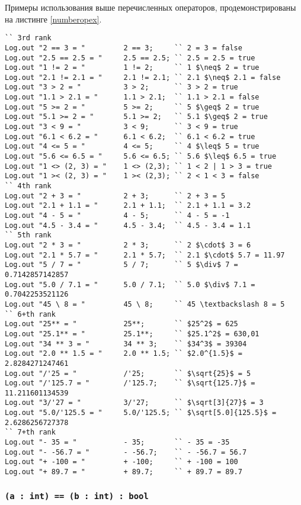 Примеры использования выше перечисленных операторов, продемонстрированы на листинге \ref{numberopex}.

\begin{lstlisting}[caption=Примеры использования операторов над данными типа int и double, label=numberopex]
`` 3rd rank
Log.out "2 == 3 = "			2 == 3;		`` 2 = 3 = false
Log.out "2.5 == 2.5 = "		2.5 == 2.5;	`` 2.5 = 2.5 = true
Log.out "1 != 2 = "			1 != 2;		`` 1 $\neq$ 2 = true
Log.out "2.1 != 2.1 = "		2.1 != 2.1;	`` 2.1 $\neq$ 2.1 = false
Log.out "3 > 2 = "			3 > 2;		`` 3 > 2 = true
Log.out "1.1 > 2.1 = "		1.1 > 2.1;	`` 1.1 > 2.1 = false
Log.out "5 >= 2 = "			5 >= 2;		`` 5 $\geq$ 2 = true
Log.out "5.1 >= 2 = "		5.1 >= 2;	`` 5.1 $\geq$ 2 = true
Log.out "3 < 9 = "			3 < 9;		`` 3 < 9 = true
Log.out "6.1 < 6.2 = "		6.1 < 6.2;	`` 6.1 < 6.2 = true
Log.out "4 <= 5 = "			4 <= 5;		`` 4 $\leq$ 5 = true
Log.out "5.6 <= 6.5 = "		5.6 <= 6.5;	`` 5.6 $\leq$ 6.5 = true
Log.out "1 <> (2, 3) = "	1 <> (2,3); `` 1 < 2 | 1 > 3 = true
Log.out "1 >< (2, 3) = "	1 >< (2,3); `` 2 < 1 < 3 = false
`` 4th rank
Log.out "2 + 3 = "			2 + 3;		`` 2 + 3 = 5
Log.out "2.1 + 1.1 = "		2.1 + 1.1;	`` 2.1 + 1.1 = 3.2
Log.out "4 - 5 = "			4 - 5;		`` 4 - 5 = -1
Log.out "4.5 - 3.4 = "		4.5 - 3.4;	`` 4.5 - 3.4 = 1.1
`` 5th rank
Log.out "2 * 3 = "			2 * 3;		`` 2 $\cdot$ 3 = 6
Log.out "2.1 * 5.7 = "		2.1 * 5.7;	`` 2.1 $\cdot$ 5.7 = 11.97
Log.out "5 / 7 = "			5 / 7;		`` 5 $\div$ 7 = 0.7142857142857
Log.out "5.0 / 7.1 = "		5.0 / 7.1;	`` 5.0 $\div$ 7.1 = 0.7042253521126
Log.out "45 \ 8 = "			45 \ 8;		`` 45 \textbackslash 8 = 5
`` 6+th rank
Log.out "25** = "			25**;		`` $25^2$ = 625
Log.out "25.1** = "			25.1**;		`` $25.1^2$ = 630,01
Log.out "34 ** 3 = "		34 ** 3;	`` $34^3$ = 39304
Log.out "2.0 ** 1.5 = "		2.0 ** 1.5;	`` $2.0^{1.5}$ = 2.8284271247461
Log.out "/'25 = "			/'25;		`` $\sqrt{25}$ = 5
Log.out "/'125.7 = "		/'125.7;	`` $\sqrt{125.7}$ = 11.211601134539
Log.out "3/'27 = "			3/'27;		`` $\sqrt[3]{27}$ = 3
Log.out "5.0/'125.5 = "		5.0/'125.5;	`` $\sqrt[5.0]{125.5}$ = 2.6286256727378
`` 7+th rank
Log.out "- 35 = "			- 35;		`` - 35 = -35
Log.out "- -56.7 = "		- -56.7;	`` - -56.7 = 56.7
Log.out "+ -100 = "			+ -100;		`` + -100 = 100
Log.out "+ 89.7 = "			+ 89.7;		`` + 89.7 = 89.7
\end{lstlisting}

\subsubsection{\lstinline|(a : int) == (b : int) : bool|}

